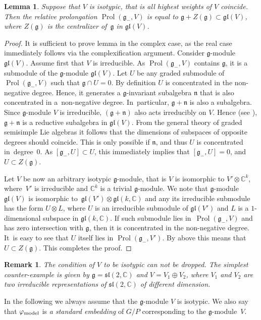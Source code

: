 \documentclass[10pt,a4paper]{amsart}
\newcommand{\C}{\mathbb C}
\newcommand{\g}{\mathfrak g}
\newcommand{\gl}{\mathfrak{gl}}
\newcommand{\n}{\mathfrak n}
\newcommand{\V}{V}
\newcommand{\sll}{\mathfrak{sl}}
\newcommand{\Prol}{\operatorname{Prol}}
\newtheorem{lem}[thm]{Lemma}
\newtheorem{rem}[thm]{Remark}}
\numberwithin{equation}{section}
\begin{document}
\begin{lem}\label{symalg}
	Suppose that $\V$ is isotypic, that is all highest weights of $\V$ coincide. Then the relative prolongation $\Prol(\g_{-},\V)$ is equal to $\g+Z(\g)\subset \gl(\V)$, where $Z(\g)$ is the centralizer of~$\g$ in $\gl(\V)$.
\end{lem}
\begin{proof}
	It is sufficient to prove lemma in the complex case, as the real case immediately follows via the complexification argument. Consider $\g$-module $\gl(\V)$. Assume first that $\V$ is irreducible. As $\Prol(\g_{-},\V)$ contains $\g$, it is a submodule of the $\g$-module $\gl(\V)$. Let $U$ be any graded submodule of $\Prol(\g_{-},\V)$ such that $\g\cap U = 0$. By definition $U$ is concentrated in the non-negative degree. Hence, it generates a $\g$-invariant subalgebra $\n$ that is also concentrated in a~non-negative degree. In~particular, $\g+\n$ is also a subalgebra. Since $\g$-module $\V$ is irreducible, $(\g+\n)$ also acts irreducibly on $\V$. Hence (see \cite[{Chapitre~1, Section~6, Th\'eor\`eme~4}]{bou}), $\g+\n$ is a reductive subalgebra in $\gl(\V)$. From the general theory of graded semisimple Lie algebras it follows that the dimensions of subspaces of opposite degrees should coincide. This is only possible if $\n$, and thus $U$ is concentrated in~degree~$0$. As $[\g_{-},U]\subset U$, this immediately implies that $[\g_{-}, U] =0$, and $U\subset Z(\g)$.
	
	Let $\V$ be now an arbitrary isotypic $\g$-module, that is $\V$ is isomorphic to $\V'\otimes \C^k$, where~$\V'$ is irreducible and $\C^k$ is a trivial $\g$-module. We note that $\g$-module $\gl(\V)$ is isomorphic to~$\gl(\V')\otimes\gl(k,\C)$ and any its irreducible submodule has the form $U\otimes L$, where $U$ is an irreducible submodule of $\gl(\V')$ and $L$ is a $1$-dimensional subspace in $\gl(k,\C)$. If such submodule lies in~$\Prol(\g_{-},\V)$ and has zero intersection with $\g$, then it is concentrated in the non-negative degree. It~is easy to see that $U$ itself lies in $\Prol(\g_{-},\V')$. By above this means that $U\subset Z(\g)$. This completes the proof.
\end{proof}

\begin{rem}
	The condition of $\V$ to be isotypic can not be dropped. The simplest counter-example is given by $\g=\sll(2,\C)$ and $\V=V_1\oplus V_2$,	where $V_1$ and $V_2$ are two irreducible representations of $\sll(2,\C)$ of different dimension.
\end{rem}
In the following we always assume that the $\g$-module $\V$ is isotypic.
We also say that $\varphi_{{\rm model}}$ is \emph{a standard embedding} of $G/P$ corresponding to the $\g$-module~$\V$.
\end{document}

